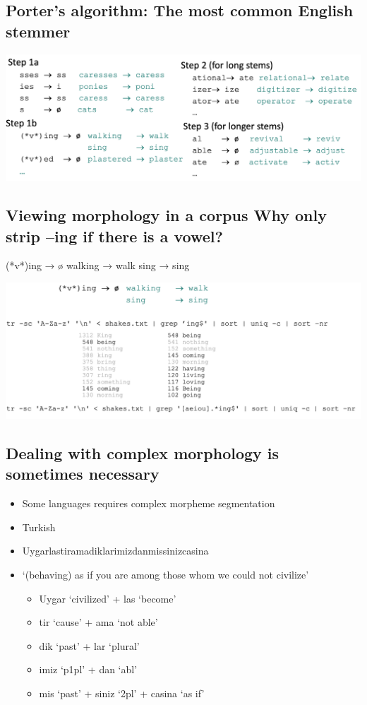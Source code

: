 \documentclass[11pt]{article}
\theoremstyle{definition}
\begin{document}
\subsection{Porter’s algorithm: 
The most common English stemmer}
\includegraphics[width=\textwidth]{4.png}

\subsection{Viewing morphology in a corpus
Why only strip –ing if there is a vowel?}

(*v*)ing → ø walking → walk
sing → sing

\includegraphics[width=\textwidth]{5.png}

\subsection{Dealing with complex morphology is
sometimes necessary}
\begin{itemize}
  \item Some languages requires complex morpheme segmentation
  \item Turkish
  \item Uygarlastiramadiklarimizdanmissinizcasina
  \item `(behaving) as if you are among those whom we could not civilize’
  \begin{itemize}
    \item Uygar `civilized’ + las `become’
    \item tir `cause’ + ama `not able’
    \item dik `past’ + lar ‘plural’
    \item imiz ‘p1pl’ + dan ‘abl’
    \item mis ‘past’ + siniz ‘2pl’ + casina ‘as if’
  \end{itemize}
\end{itemize}
\end{document}
